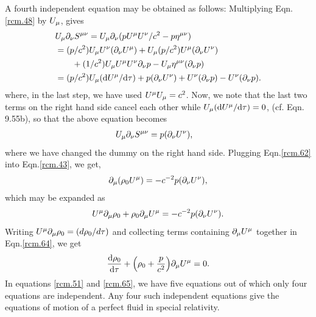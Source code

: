 A fourth independent equation may be obtained as follows:
Multiplying Eqn.\eqref{rcm.48} by $U_{{\mu}}$, gives
\begin{align*}
&U_{{\mu}}{\partial}_{{\nu}} S^{{\mu}{\nu}}=U_{{\mu}}{\partial}_{{\nu}} (p U^{{\mu}} 
U^{{\nu}}/c^2
-p\eta^{{\mu}{\nu}})\notag\\
&=(p/c^2)U_{{\mu}} U^{{\nu}}({\partial}_{{\nu}} U^{{\mu}})
+U_{{\mu}}(p/c^2)U^{{\mu}} ({\partial}_{{\nu}} U^{{\nu}})\notag\\&\qquad
+(1/c^2)U_{{\mu}} U^{{\mu}} U^{{\nu}}{\partial}_{{\nu}} p
-U_{{\mu}} \eta^{{\mu}{\nu}}({\partial}_{{\nu}} p)\notag\\
&=(p/c^2) U_{{\mu}} (\mathrm{d} U^{{\mu}}/\mathrm{d} {\tau}) 
+p ({\partial}_{{\nu}} U^{{\nu}})
+ U^{{\nu}}({\partial}_{{\nu}} p) -U^{{\nu}}({\partial}_{{\nu}} p).
\end{align*}
where, in the last step, we have used $U^{{\mu}} U_{{\mu}}=c^2$. 
Now, we note that the last two terms on the right hand side 
cancel each other while  $U_{{\mu}} (\mathrm{d} U^{{\mu}}/\mathrm{d} {\tau}) =0$, 
(cf. Eqn. 9.55b),  so that the above equation becomes 
\begin{align}\label{rcm.62}
U_{{\mu}}{\partial}_{{\nu}} S^{{\mu}{\nu}}
&=p({\partial}_{{\nu}} U^{{\nu}}),
\end{align}
where we have changed the dummy on the right hand side.
Plugging Eqn.\eqref{rcm.62} into Eqn.\eqref{rcm.43}, we get,
\begin{align}\label{rcm.63}
 {\ensuremath{\partial}}_{{\mu}} (\rho_0 U^{{\mu}})
=-c^{-2}p({\partial}_{{\nu}} U^{{\nu}}),
\end{align}
which may be expanded  as
\begin{align}\label{rcm.64}
U^{{\mu}} {\partial}_{{\mu}} \rho_0  + \rho_0 {\partial}_{{\mu}} U^{{\mu}}
=-c^{-2}p({\partial}_{{\nu}} U^{{\nu}}).
\end{align}
Writing $U^{{\mu}} {\partial}_{{\mu}} \rho_0=(d\rho_0/d{\tau})$ and
collecting terms containing ${\partial}_{{\mu}} U^{{\mu}}$ together  in
Eqn.\eqref{rcm.64}, we get
\begin{align}\label{rcm.65}
\frac{\mathrm{d} \rho_0}{\mathrm{d} {\tau}} +
\Big(\rho_0+\frac{p}{c^2}\Big){\partial}_{{\mu}} U^{{\mu}}=0.
\end{align}
In equations \eqref{rcm.51} and  \eqref{rcm.65}, we have
five equations out of  which only four equations are
independent. Any four such independent equations give  the
equations of motion of a perfect fluid in special 
relativity.

